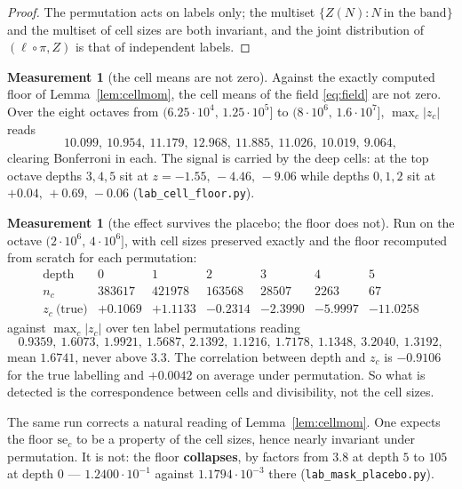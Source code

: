 \documentclass[11pt,a4paper]{article}
\theoremstyle{plain}
\theoremstyle{definition}
\newtheorem{measurement}[theorem]{Measurement}
\theoremstyle{remark}
\begin{document}
\begin{proof}
The permutation acts on labels only; the multiset
$\{Z(N):N\ \text{in the band}\}$ and the multiset of cell sizes are
both invariant, and the joint distribution of $(\ell\circ\pi,Z)$ is
that of independent labels.
\end{proof}

\begin{measurement}[the cell means are not zero]\label{meas:notzero}
Against the exactly computed floor of Lemma~\ref{lem:cellmom}, the
cell means of the field \eqref{eq:field} are not zero. Over the eight
octaves from $(6.25\cdot10^4,\,1.25\cdot10^5]$ to
$(8\cdot10^6,\,1.6\cdot10^7]$, $\max_c|z_c|$ reads
\[
  10.099,\ 10.954,\ 11.179,\ 12.968,\ 11.885,\ 11.026,\ 10.019,\ 9.064,
\]
clearing Bonferroni in each. The signal is carried by the deep cells:
at the top octave depths $3,4,5$ sit at $z=-1.55,\,-4.46,\,-9.06$
while depths $0,1,2$ sit at $+0.04,\,+0.69,\,-0.06$
(\texttt{lab\_cell\_floor.py}).
\end{measurement}

\begin{measurement}[the effect survives the placebo; the floor does
not]\label{meas:placebo}
Run on the octave $(2\cdot10^6,\,4\cdot10^6]$, with cell sizes
preserved exactly and the floor recomputed from scratch for each
permutation:
\[
\begin{array}{r|cccccc}
 \text{depth} & 0 & 1 & 2 & 3 & 4 & 5\\
 n_c & 383617 & 421978 & 163568 & 28507 & 2263 & 67\\\hline
 z_c\ \text{(true)} & +0.1069 & +1.1133 & -0.2314 & -2.3990
   & -5.9997 & -11.0258
\end{array}
\]
against $\max_c|z_c|$ over ten label permutations reading
\[
  0.9359,\ 1.6073,\ 1.9921,\ 1.5687,\ 2.1392,\
  1.1216,\ 1.7178,\ 1.1348,\ 3.2040,\ 1.3192,
\]
mean $1.6741$, never above $3.3$. The
correlation between depth and $z_c$ is $-0.9106$ for the true
labelling and $+0.0042$ on average under permutation. So what is
detected is the correspondence between cells and divisibility, not the
cell sizes.

The same run corrects a natural reading of Lemma~\ref{lem:cellmom}.
One expects the floor $\mathrm{se}_c$ to be a property of the cell
sizes, hence nearly invariant under permutation. It is not: the floor
\textbf{collapses}, by factors from $3.8$ at depth $5$ to $105$ at
depth $0$ --- $1.2400\cdot10^{-1}$ against $1.1794\cdot10^{-3}$ there
(\texttt{lab\_mask\_placebo.py}).
\end{measurement}
\end{document}
